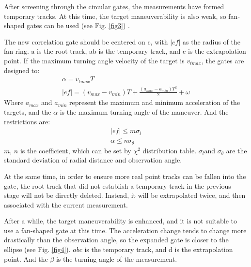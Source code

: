 \documentclass[default,iicol]{sn-jnl}%
\theoremstyle{thmstyleone}%
\theoremstyle{thmstyletwo}%
\theoremstyle{thmstylethree}%
\begin{document}
After screening through the circular gates, the measurements have formed temporary tracks. At this time, the target maneuverability is also weak, so fan-shaped gates can be used (see Fig. \ref{fig3}) \cite{bib2}.

The new correlation gate should be centered on c, with $\lvert e f \rvert$ as the radius of the fan ring. a is the root track, ab is the temporary track, and c is the extrapolation point. If the maximum turning angle velocity of the target is $v _ { t m a x }$, the gates are designed to:
\begin{equation}
    \left. \begin{array}  { l  }  {  \alpha  = v _ { t m a x } T } \\ { \lvert e f \rvert  = ( v _ { m a x } - v _ { m i n } ) T + \frac { ( a _ { m a x } - a _ { m i n } ) T ^ { 2 } } { 2 } + \omega } \end{array} \right.
    \label{eq2}
\end{equation}
Where  $a _ { m a x }$ and  $a _ { m i n }$ represent the maximum and minimum acceleration of the targets, and the $\alpha$ is the maximum turning angle of the maneuver. And the restrictions are:
\begin{equation}
    \left. \begin{array}  { l  }  { \lvert e f \rvert \leq m \sigma _ { l } } \\ { \alpha \leq n \sigma _ { \theta } } \end{array} \right.
    \label{eq3}
\end{equation}
$m$, $n$ is the coefficient, which can be set by $\chi^2$ distribution table. $\sigma _ { l }$and $\sigma _ { \theta }$ are the standard deviation of radial distance and observation angle.

At the same time, in order to ensure more real point tracks can be fallen into the gate, the root track that did not establish a temporary track in the previous stage will not be directly deleted. Instead, it will be extrapolated twice, and then associated with the current measurement.

After a while, the target maneuverability is enhanced, and it is not suitable to use a fan-shaped gate at this time. The acceleration change tends to change more drastically than the observation angle, so the expanded gate is closer to the ellipse (see Fig. \ref{fig4}).
$abc$ is the temporary track, and d is the extrapolation point. And the $\beta$ is the turning angle of the measurement.
\end{document}
